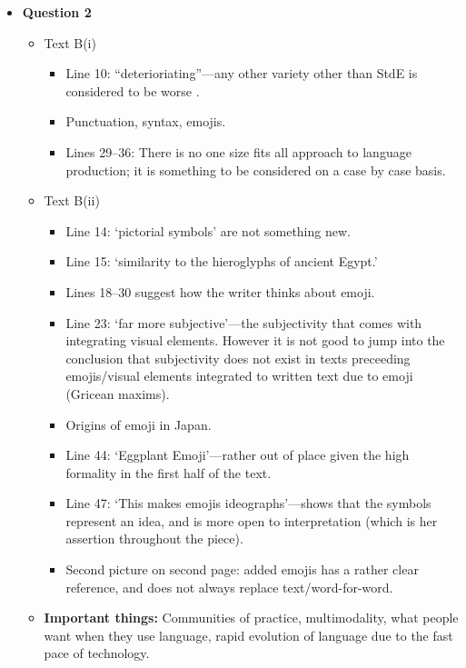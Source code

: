 \documentclass[../main.tex]{subfiles}
\begin{document}
\begin{itemize}
					\item \textbf{Question 2} \begin{itemize}
						\item Text B(i) \begin{itemize}
							\item Line 10: ``deterioriating''---any other variety other than StdE is considered to be worse .
							\item Punctuation, syntax, emojis.
							\item Lines 29--36: There is no one size fits all approach to language production; it is something to be considered on a case by case basis.
						\end{itemize}
						\item Text B(ii) \begin{itemize}
							\item Line 14: `pictorial symbols' are not something new.
							\item Line 15: `similarity to the hieroglyphs of ancient Egypt.'
							\item Lines 18--30 suggest how the writer thinks about emoji.
							\item Line 23: `far more subjective'---the subjectivity that comes with integrating visual elements. However it is not good to jump into the conclusion that subjectivity does not exist in texts preceeding emojis/visual elements integrated to written text due to emoji (Gricean maxims).
							\item Origins of emoji in Japan.
							\item Line 44: `Eggplant Emoji'---rather out of place given the high formality in the first half of the text.
							\item Line 47: `This makes emojis ideographs'---shows that the symbols represent an idea, and is more open to interpretation (which is her assertion throughout the piece).
							\item Second picture on second page: added emojis has a rather clear reference, and does not always replace text/word-for-word.
						\end{itemize}
						\item \textbf{Important things:} Communities of practice, multimodality, what people want when they use language, rapid evolution of language due to the fast pace of technology.
					\end{itemize}
					

\end{itemize}
\end{document}
